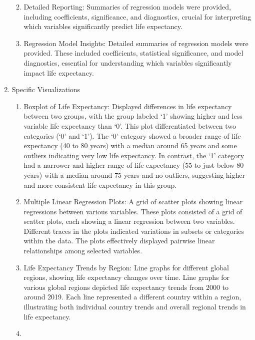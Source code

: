 \documentclass[
]{article}
\providecommand{\tightlist}{%
  \setlength{\itemsep}{0pt}\setlength{\parskip}{0pt}}
\begin{document}
\begin{enumerate}
  \begin{enumerate}
  \def\labelenumii{\alph{enumii}.}
  \tightlist
  \item
    Detailed Reporting: Summaries of regression models were provided,
    including coefficients, significance, and diagnostics, crucial for
    interpreting which variables significantly predict life expectancy.
  \item
    Regression Model Insights: Detailed summaries of regression models
    were provided. These included coefficients, statistical
    significance, and model diagnostics, essential for understanding
    which variables significantly impact life expectancy.
  \end{enumerate}
\item
  Specific Visualizations

  \begin{enumerate}
  \def\labelenumii{\alph{enumii}.}
  \item
    Boxplot of Life Expectancy: Displayed differences in life expectancy
    between two groups, with the group labeled `1' showing higher and
    less variable life expectancy than `0'. This plot differentiated
    between two categories (`0' and `1'). The `0' category showed a
    broader range of life expectancy (40 to 80 years) with a median
    around 65 years and some outliers indicating very low life
    expectancy. In contrast, the `1' category had a narrower and higher
    range of life expectancy (55 to just below 80 years) with a median
    around 75 years and no outliers, suggesting higher and more
    consistent life expectancy in this group.
  \item
    Multiple Linear Regression Plots: A grid of scatter plots showing
    linear regressions between various variables. These plots consisted
    of a grid of scatter plots, each showing a linear regression between
    two variables. Different traces in the plots indicated variations in
    subsets or categories within the data. The plots effectively
    displayed pairwise linear relationships among selected variables.
  \item
    Life Expectancy Trends by Region: Line graphs for different global
    regions, showing life expectancy changes over time. Line graphs for
    various global regions depicted life expectancy trends from 2000 to
    around 2019. Each line represented a different country within a
    region, illustrating both individual country trends and overall
    regional trends in life expectancy.
  \item

\end{enumerate}
\end{enumerate}
\end{document}
